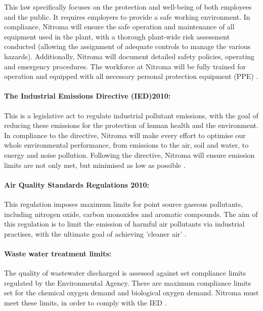 This law specifically focuses on the protection and well-being of both employees and the public. It requires employers to provide a safe working environment. In compliance, Nitroma will ensure the safe operation and maintenance of all equipment used in the plant, with a thorough plant-wide risk assessment conducted (allowing the assignment of adequate controls to manage the various hazards). Additionally, Nitroma will document detailed safety policies, operating and emergency procedures. The workforce at Nitroma will be fully trained for operation and equipped with all necessary personal protection equipment (PPE) \cite{british_safety_council_health_nodate}.

\paragraph{The Industrial Emissions Directive (IED)2010:}

This is a legislative act to regulate industrial pollutant emissions, with the goal of reducing these emissions for the protection of human health and the environment. In compliance to the directive, Nitroma will make every effort to optimise our whole environmental performance, from emissions to the air, soil and water, to energy and noise pollution. Following the directive, Nitroma will ensure emission limits are not only met, but minimised as low as  possible \cite{european_commission_industrial_nodate}. 

\paragraph{Air Quality Standards Regulations 2010:}

This regulation imposes maximum limits for point source gaseous pollutants, including nitrogen oxide, carbon monoxides and aromatic compounds. The aim of this regulation is to limit the emission of harmful air pollutants via industrial practises, with the ultimate goal of achieving 'cleaner air' \cite{tilling_meeting_2017}.  

\paragraph{Waste water treatment limits:}

The quality of wastewater discharged is assessed against set compliance limits regulated by the Environmental Agency. There are maximum compliance limits set for the chemical oxygen demand and biological oxygen demand. Nitroma must meet these limits, in order to comply with the IED \cite{environment_agency_waste_nodate}. 

